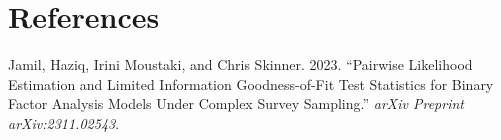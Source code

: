 \documentclass[
]{article}
\newlength{\cslhangindent}
\newlength{\cslentryspacingunit} %
\newenvironment{CSLReferences}[2] %
 {%
  \setlength{\parindent}{0pt}
  \ifodd #1
  \let\oldpar\par
  \def\par{\hangindent=\cslhangindent\oldpar}
  \fi
  \setlength{\parskip}{#2\cslentryspacingunit}
 }%
 {}
\begin{document}
\hypertarget{references}{%
\section*{References}\label{references}}

\hypertarget{refs}{}
\begin{CSLReferences}{1}{0}
\leavevmode{}%
Jamil, Haziq, Irini Moustaki, and Chris Skinner. 2023. {``Pairwise
Likelihood Estimation and Limited Information Goodness-of-Fit Test
Statistics for Binary Factor Analysis Models Under Complex Survey
Sampling.''} \emph{arXiv Preprint arXiv:2311.02543}.

\end{CSLReferences}
\end{document}

